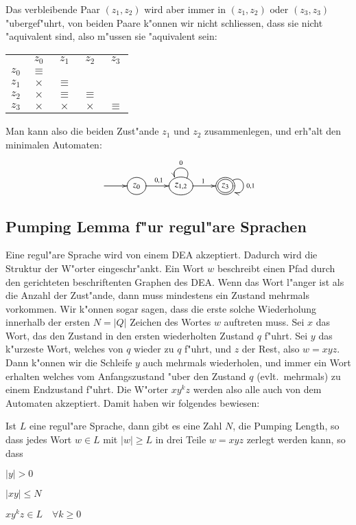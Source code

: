 Das verbleibende Paar $(z_1,z_2)$ wird aber immer in $(z_1,z_2)$ 
oder $(z_3,z_3)$ "ubergef"uhrt, von beiden Paare k"onnen wir nicht
schliessen, dass sie nicht "aquivalent sind, also m"ussen sie "aquivalent
sein:
\begin{center}
\begin{tabular}{ccccc}
     &$z_0$   &$z_1$   &$z_2$   &$z_3$   \\
$z_0$&$\equiv$&        &        &        \\
$z_1$&$\times$&$\equiv$&        &        \\
$z_2$&$\times$&$\equiv$&$\equiv$&        \\
$z_3$&$\times$&$\times$&$\times$&$\equiv$
\end{tabular}
\end{center}
Man kann also die beiden Zust"ande $z_1$ und $z_2$ zusammenlegen,
und erh"alt den minimalen Automaten:
\[
\entrymodifiers={++[o][F]}
\xymatrix{
*+\txt{} \ar[r]
	&{z_0}\ar[r]^{0,1} 
		&{z_{1,2}}\ar@(ur,ul)_{0}\ar[r]^1
			&*++[o][F=]{z_3}\ar@(ur,dr)^{0,1}
}
\]
\subsection{Pumping Lemma f"ur regul"are Sprachen}
Eine regul"are Sprache wird von einem DEA akzeptiert. Dadurch wird
die Struktur der W"orter eingeschr"ankt. Ein Wort $w$ beschreibt
einen Pfad durch den gerichteten beschriftenten Graphen des DEA.
Wenn das Wort l"anger ist als die Anzahl der Zust"ande, dann muss
mindestens ein Zustand mehrmals vorkommen. Wir k"onnen sogar
sagen, dass die erste solche Wiederholung innerhalb der ersten
$N = |Q|$ Zeichen des Wortes $w$ auftreten muss. Sei $x$ das Wort,
das den Zustand in den ersten wiederholten Zustand $q$ f"uhrt.
Sei $y$ das k"urzeste Wort, welches von $q$ wieder zu $q$ f"uhrt, und
$z$ der Rest, also $w=xyz$. Dann k"onnen wir die Schleife $y$
auch mehrmals wiederholen, und immer ein Wort erhalten welches
vom Anfangszustand "uber den Zustand $q$ (evlt.~mehrmals) zu einem
Endzustand f"uhrt. Die W"orter $xy^kz$ werden also alle auch von
dem Automaten akzeptiert. Damit haben wir folgendes bewiesen:
\begin{satz}
Ist $L$ eine regul"are Sprache, dann gibt es eine Zahl $N$, die Pumping Length, so dass
jedes Wort $w\in L$ mit $|w|\ge L$ in drei Teile
$w=xyz$ zerlegt werden kann, so dass
\begin{compactenum}
\item $|y| > 0$
\item $|xy|\le N$
\item $xy^kz\in L\quad\forall k\ge 0$
\end{compactenum}
\end{satz}

